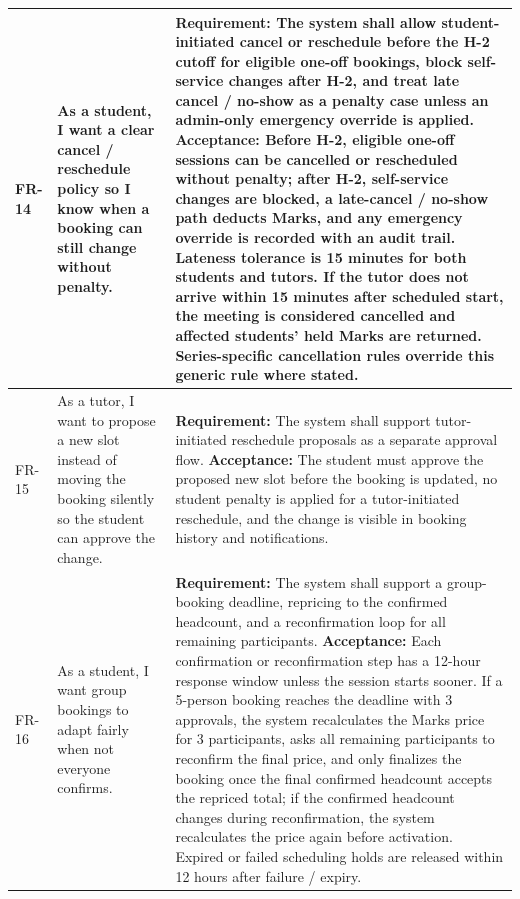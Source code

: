 \documentclass[11pt,a4paper]{article}
\begin{document}
\begin{longtable}{|L{1.5cm}|L{4.1cm}|L{9.0cm}|}
	FR-14           & As a student, I want a clear cancel / reschedule policy so I know when a booking can still change without penalty.     & \textbf{Requirement:} The system shall allow student-initiated cancel or reschedule before the H-2 cutoff for eligible one-off bookings, block self-service changes after H-2, and treat late cancel / no-show as a penalty case unless an admin-only emergency override is applied. \newline \textbf{Acceptance:} Before H-2, eligible one-off sessions can be cancelled or rescheduled without penalty; after H-2, self-service changes are blocked, a late-cancel / no-show path deducts Marks, and any emergency override is recorded with an audit trail. Lateness tolerance is 15 minutes for both students and tutors. If the tutor does not arrive within 15 minutes after scheduled start, the meeting is considered cancelled and affected students' held Marks are returned. Series-specific cancellation rules override this generic rule where stated.                                                                                                      \\
	\hline
	FR-15           & As a tutor, I want to propose a new slot instead of moving the booking silently so the student can approve the change. & \textbf{Requirement:} The system shall support tutor-initiated reschedule proposals as a separate approval flow. \newline \textbf{Acceptance:} The student must approve the proposed new slot before the booking is updated, no student penalty is applied for a tutor-initiated reschedule, and the change is visible in booking history and notifications.                                                                                                                                                                                                                                                     \\
	\hline
	FR-16           & As a student, I want group bookings to adapt fairly when not everyone confirms.                                        & \textbf{Requirement:} The system shall support a group-booking deadline, repricing to the confirmed headcount, and a reconfirmation loop for all remaining participants. \newline \textbf{Acceptance:} Each confirmation or reconfirmation step has a 12-hour response window unless the session starts sooner. If a 5-person booking reaches the deadline with 3 approvals, the system recalculates the Marks price for 3 participants, asks all remaining participants to reconfirm the final price, and only finalizes the booking once the final confirmed headcount accepts the repriced total; if the confirmed headcount changes during reconfirmation, the system recalculates the price again before activation. Expired or failed scheduling holds are released within 12 hours after failure / expiry. \\

\end{longtable}
\end{document}
